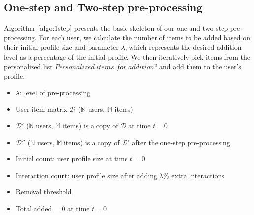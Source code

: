 \documentclass[runningheads]{llncs}
\begin{document}
\subsection{One-step and Two-step pre-processing}
\label{sub:One}
Algorithm~\ref{algo:1step} presents the basic skeleton of our one and two-step pre-processing.
For each user, we calculate the number of items to be added based on their initial profile size and parameter \( \lambda \), which represents the desired addition level as a percentage of the initial profile.
We then iteratively pick items from the personalized list 
\( Personalized\_items\_for\_addition^{u} \) 
and add them to the user's profile.
\begin{algorithm}[h]
\tiny{
\DontPrintSemicolon
  
  \KwInput{}
  \begin{itemize}
      \item \( \lambda \): level of pre-processing
      \item User-item matrix \( \mathcal{D} \) (\( \mathbb{N} \) users, \( \mathbb{M} \) items)
      \item \( \mathcal{D}' \) (\( \mathbb{N} \) users, \( \mathbb{M} \) items) is a copy of \( \mathcal{D} \) at time $t=0$
      \item \( \mathcal{D}'' \) (\( \mathbb{N} \) users, \( \mathbb{M} \) items) is a copy of \( \mathcal{D}' \) after the one-step pre-processing. 
      \item Initial count: user profile size at time \( t = 0 \) 
      \item Interaction count: user profile size after adding $\lambda \%$ extra interactions
      \item Removal threshold
      \item Total added = 0 at time \( t = 0 \) 
  \end{itemize}
  
  
  
  }
\end{algorithm}
\end{document}
